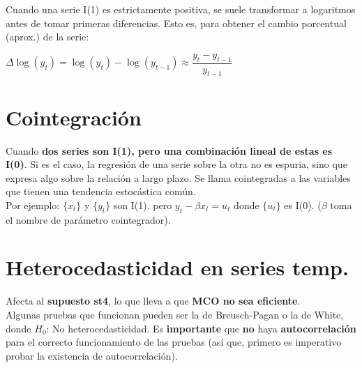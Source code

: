 \documentclass[10pt, a4paper, landscape]{extarticle}
\begin{document}
\begin{multicols}{3}
\begin{multicols}{2}
		\end{multicols}
		Cuando una serie I(1) es estrictamente positiva, se suele transformar a logaritmos antes de tomar primeras diferencias. Esto es, para obtener el cambio porcentual (aprox.) de la serie:
		\begin{center}
			$\Delta \log(y_t) = \log(y_t) - \log(y_{t-1}) \approx \dfrac{y_t - y_{t-1}}{y_{t-1}}$
		\end{center}
\columnbreak
\section*{Cointegración}
	Cuando \textbf{dos series son I(1), pero una combinación lineal de estas es I(0)}. Si es el caso, la regresión de una serie sobre la otra no es espuria, sino que expresa algo sobre la relación a largo plazo. Se llama cointegradas a las variables que tienen una tendencia estocástica común. \\
	Por ejemplo: $\lbrace x_t \rbrace$ y $\lbrace y_t \rbrace$ son I(1), pero $y_t - \beta x_t = u_t$ donde $\lbrace u_t \rbrace$ es I(0). ($\beta$ toma el nombre de parámetro cointegrador).

\section*{Heterocedasticidad en series temp.}
	Afecta al \textbf{supuesto st4}, lo que lleva a que \textbf{MCO no sea eficiente}. \\
	Algunas pruebas que funcionan pueden ser la de Breusch-Pagan o la de White, donde $H_0$: No heterocedasticidad. Es \textbf{importante} que \textbf{no} haya \textbf{autocorrelación} para el correcto funcionamiento de las pruebas (así que, primero es imperativo probar la existencia de autocorrelación).

\end{multicols}
\end{document}
